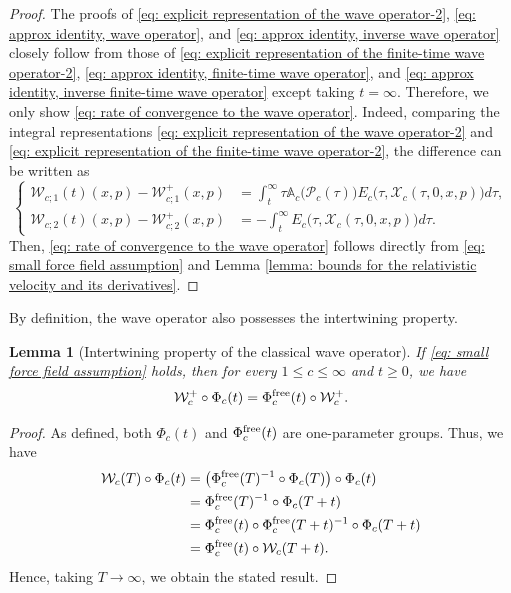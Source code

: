 \documentclass[reqno, 11pt, letterpaper]{amsart}
\newtheorem{lemma}[theorem]{Lemma}
\theoremstyle{remark}
\numberwithin{equation}{section}
\numberwithin{theorem}{section}
\numberwithin{table}{section}
\numberwithin{figure}{section}
\begin{document}
\begin{proof}
The proofs of \eqref{eq: explicit representation of the wave operator-2}, \eqref{eq: approx identity, wave operator}, and \eqref{eq: approx identity, inverse wave operator} closely follow from those of \eqref{eq: explicit representation of the finite-time wave operator-2}, \eqref{eq: approx identity, finite-time wave operator}, and \eqref{eq: approx identity, inverse finite-time wave operator} except taking $t=\infty$. Therefore, we only show  \eqref{eq: rate of convergence to the wave operator}. Indeed, comparing the integral representations \eqref{eq: explicit representation of the wave operator-2} and \eqref{eq: explicit representation of the finite-time wave operator-2}, the difference can be written as 
$$\left\{\begin{aligned}
\mathcal{W}_{c;1}(t)(x,p)-\mathcal{W}_{c;1}^+(x,p)&=\int_t^\infty  \tau\mathbb{A}_c\big(\mathcal{P}_c(\tau)\big) E_c\big(\tau,\mathcal{X}_c(\tau,0,x,p)\big)d\tau,\\
\mathcal{W}_{c;2}(t)(x,p)-\mathcal{W}_{c;2}^+(x,p)&=-\int_t^\infty E_c\big(\tau,\mathcal{X}_c(\tau,0,x,p)\big)d\tau.
\end{aligned}\right.$$
Then, \eqref{eq: rate of convergence to the wave operator} follows directly from \eqref{eq: small force field assumption} and Lemma \ref{lemma: bounds for the relativistic velocity and its derivatives}.
\end{proof}

By definition, the wave operator also possesses the intertwining property.

\begin{lemma}[Intertwining property of the classical wave operator]\label{lemma: intertwining property of the classical wave operator}
If \eqref{eq: small force field assumption}  holds, then
for every $1 \leq c \leq \infty$ and $t \geq 0$, we have
$$\mathcal{W}_c^+\circ\Phi_c(t)=\Phi_c^{\textup{free}}(t)\circ \mathcal{W}_c^+.$$
\end{lemma}

\begin{proof}
As defined, both $\Phi_c(t)$ and $\Phi_c^{\textup{free}}(t)$ are one-parameter groups. Thus, we have
$$\begin{aligned}
\mathcal{W}_c(T)\circ\Phi_c(t) &=
\big(\Phi_c^{\textup{free}}(T)^{-1}\circ\Phi_c(T)\big)\circ\Phi_c(t)\\
&=\Phi_c^{\textup{free}}(T)^{-1}\circ\Phi_c(T+t)\\
&=\Phi_c^{\textup{free}}(t)\circ \Phi_c^{\textup{free}}(T+t)^{-1}\circ\Phi_c(T+t)\\
&=\Phi_c^{\textup{free}}(t)\circ \mathcal{W}_c(T+t).
\end{aligned}$$
Hence, taking $T\to\infty$, we obtain the stated result.
\end{proof}
\end{document}
